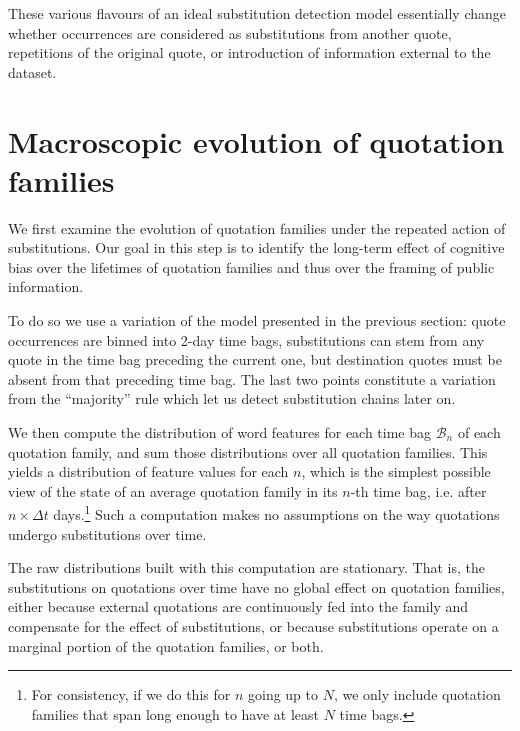These various flavours of an ideal substitution detection model essentially change whether occurrences are considered as substitutions from another quote, repetitions of the original quote, or introduction of information external to the dataset.

\section{Macroscopic evolution of quotation families}

We first examine the evolution of quotation families under the repeated action of substitutions.
Our goal in this step is to identify the long-term effect of cognitive bias over the lifetimes of quotation families and thus over the framing of public information.

To do so we use a variation of the model presented in the previous section: quote occurrences are binned into 2-day time bags, substitutions can stem from any quote in the time bag preceding the current one, but destination quotes must be absent from that preceding time bag. The last two points constitute a variation from the ``majority'' rule which let us detect substitution chains later on.


We then compute the distribution of word features for each time bag $\mathcal{B}_n$ of each quotation family, and sum those distributions over all quotation families.
This yields a distribution of feature values for each $n$, which is the simplest possible view of the state of an average quotation family in its $n$-th time bag, i.e. after $n \times \Delta t$ days.\footnote{For consistency, if we do this for $n$ going up to $N$, we only include quotation families that span long enough to have at least $N$ time bags.}
Such a computation makes no assumptions on the way quotations undergo substitutions over time.

The raw distributions built with this computation are stationary.
That is, the substitutions on quotations over time have no global effect on quotation families, either because external quotations are continuously fed into the family and compensate for the effect of substitutions, or because substitutions operate on a marginal portion of the quotation families, or both.

